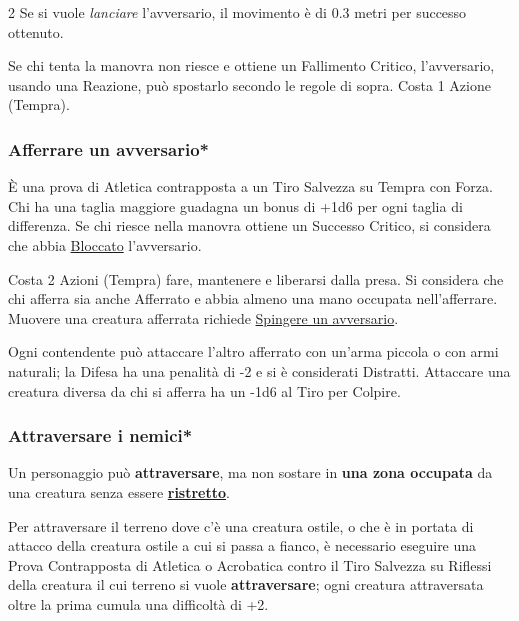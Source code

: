 \begin{multicols}{2}
Se si vuole \emph{lanciare} l'avversario, il movimento è di 0.3 metri per successo ottenuto.

Se chi tenta la manovra non riesce e ottiene un Fallimento Critico, l'avversario, usando una Reazione, può spostarlo secondo le regole di sopra. Costa 1 Azione (Tempra).

\subsubsection{Afferrare un avversario*}\label{afferrareunavversario}\hypertarget{afferrareunavversario}{}

È una prova di Atletica contrapposta a un Tiro Salvezza su Tempra con Forza. Chi ha una taglia maggiore guadagna un bonus di +1d6 per ogni taglia di differenza. Se chi riesce nella manovra ottiene un Successo Critico, si considera che abbia \hyperlink{bloccato}{Bloccato} l'avversario.

Costa 2 Azioni (Tempra) fare, mantenere e liberarsi dalla presa. Si considera che chi afferra sia anche Afferrato e abbia almeno una mano occupata nell'afferrare.
Muovere una creatura afferrata richiede \hyperlink{spingereavversario}{Spingere un avversario}.

Ogni contendente può attaccare l'altro afferrato con un'arma piccola o con armi naturali; la Difesa ha una penalità di -2 e si è considerati Distratti. Attaccare una creatura diversa da chi si afferra ha un -1d6 al Tiro per Colpire.

\subsubsection{Attraversare i nemici*}\label{attraversonemici}\hypertarget{attraversarenemici}{}\hypertarget{destreggiarsi}{}

Un personaggio può \textbf{attraversare}, ma non sostare in \textbf{una zona occupata} da una creatura senza essere \hyperlink{ristretto}{\textbf{ristretto}}.

Per attraversare il terreno dove c'è una creatura ostile, o che è in portata di attacco della creatura ostile a cui si passa a fianco, è necessario eseguire una Prova Contrapposta di Atletica o Acrobatica contro il Tiro Salvezza su Riflessi della creatura il cui terreno si vuole \textbf{attraversare}; ogni creatura attraversata oltre la prima cumula una difficoltà di +2.


\end{multicols}
